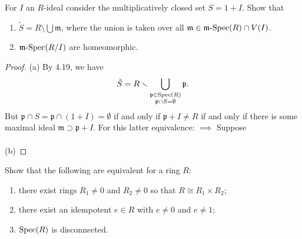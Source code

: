 \begin{problem}
For $I$ an $R$-ideal consider the multiplicatively
closed set $S=1+I$. Show that
\begin{enumerate}[noitemsep,label=(\alph*)]
\item $\tilde S=R\setminus\bigcup\mathfrak{m}$, where the
  union is taken over all
  $\mathfrak{m}\in\operatorname{\mathfrak{m}-Spec}(R)\cap V(I)$.
\item $\operatorname{\mathfrak{m}-Spec}(R/I)$ are homeomorphic.
\end{enumerate}
\end{problem}
\begin{proof}
(a) By 4.19, we have
\[
\tilde
S=R\smallsetminus\bigcup_{\substack{\mathfrak{p}\in\operatorname{Spec}(R)\\\mathfrak{p}\cap
  S=\emptyset}}\mathfrak{p}.
\]
But $\mathfrak{p}\cap S=\mathfrak{p}\cap (1+I)=\emptyset$ if and
only if $\mathfrak{p}+I\neq R$ if and only if there is some
maximal ideal $\mathfrak{m}\supset \mathfrak{p}+I$. For this
latter equivalence: $\implies$ Suppose
\\\\
(b)
\end{proof}
\newpage
\begin{problem}
Show that the following are equivalent for a ring $R$:
\begin{enumerate}[noitemsep,label=(\alph*)]
\item there exist rings $R_1\neq 0$ and $R_2\neq 0$ so that
  $R\cong R_1\times R_2$;
\item there exist an idempotent $e\in R$ with $e\neq 0$ and
  $e\neq 1$;
\item $\operatorname{Spec}(R)$ is disconnected.
\end{enumerate}
\end{problem}
